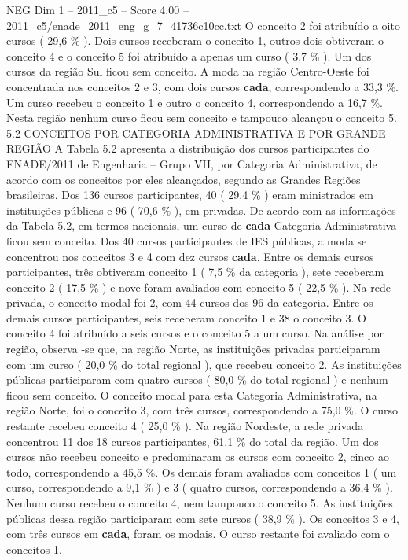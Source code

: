 \begin{textsample}{NEG Dim 1 – 2011\_c5 – Score 4.00 – 2011\_c5/enade\_2011\_eng\_g\_7\_41736c10cc.txt}
O conceito 2 foi atribuído a oito cursos ( 29,6 \% ).
Dois cursos receberam o conceito 1, outros dois obtiveram o conceito 4 e o conceito 5 foi atribuído a apenas um curso ( 3,7 \% ).
Um dos cursos da região Sul ficou sem conceito.
A moda na região Centro-Oeste foi concentrada nos conceitos 2 e 3, com dois cursos \textbf{cada}, correspondendo a 33,3 \%.
Um curso recebeu o conceito 1 e outro o conceito 4, correspondendo a 16,7 \%.
Nesta região nenhum curso ficou sem conceito e tampouco alcançou o conceito 5. 5.2 CONCEITOS POR CATEGORIA ADMINISTRATIVA E POR GRANDE REGIÃO A Tabela 5.2 apresenta a distribuição dos cursos participantes do ENADE/2011 de Engenharia – Grupo VII, por Categoria Administrativa, de acordo com os conceitos por eles alcançados, segundo as Grandes Regiões brasileiras.
Dos 136 cursos participantes, 40 ( 29,4 \% ) eram ministrados em instituições públicas e 96 ( 70,6 \% ), em privadas.
De acordo com as informações da Tabela 5.2, em termos nacionais, um curso de \textbf{cada} Categoria Administrativa ficou sem conceito.
Dos 40 cursos participantes de IES públicas, a moda se concentrou nos conceitos 3 e 4 com dez cursos \textbf{cada}.
Entre os demais cursos participantes, três obtiveram conceito 1 ( 7,5 \% da categoria ), sete receberam conceito 2 ( 17,5 \% ) e nove foram avaliados com conceito 5 ( 22,5 \% ).
Na rede privada, o conceito modal foi 2, com 44 cursos dos 96 da categoria.
Entre os demais cursos participantes, seis receberam conceito 1 e 38 o conceito 3.
O conceito 4 foi atribuído a seis cursos e o conceito 5 a um curso.
Na análise por região, observa -se que, na região Norte, as instituições privadas participaram com um curso ( 20,0 \% do total regional ), que recebeu conceito 2.
As instituições públicas participaram com quatro cursos ( 80,0 \% do total regional ) e nenhum ficou sem conceito.
O conceito modal para esta Categoria Administrativa, na região Norte, foi o conceito 3, com três cursos, correspondendo a 75,0 \%.
O curso restante recebeu conceito 4 ( 25,0 \% ).
Na região Nordeste, a rede privada concentrou 11 dos 18 cursos participantes, 61,1 \% do total da região.
Um dos cursos não recebeu conceito e predominaram os cursos com conceito 2, cinco ao todo, correspondendo a 45,5 \%.
Os demais foram avaliados com conceitos 1 ( um curso, correspondendo a 9,1 \% ) e 3 ( quatro cursos, correspondendo a 36,4 \% ).
Nenhum curso recebeu o conceito 4, nem tampouco o conceito 5.
As instituições públicas dessa região participaram com sete cursos ( 38,9 \% ).
Os conceitos 3 e 4, com três cursos em \textbf{cada}, foram os modais.
O curso restante foi avaliado com o conceitos 1.

\end{textsample}
